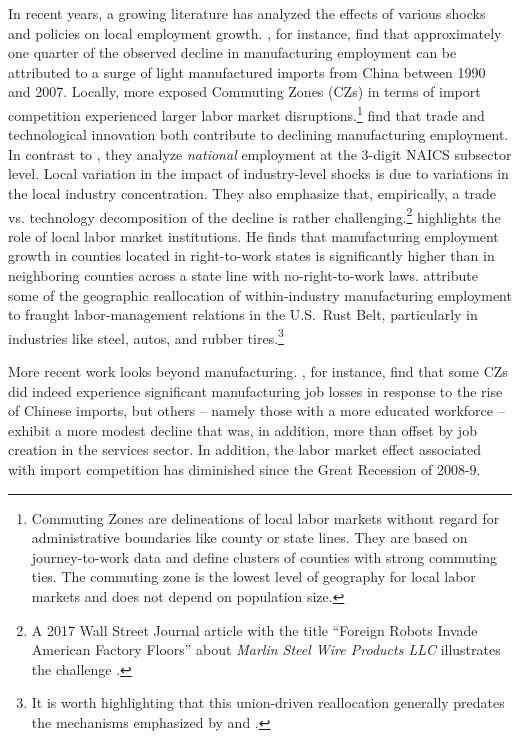 \documentclass[onehalfspacing,11pt]{article}
\begin{document}
In recent years, a growing literature has analyzed the effects of various shocks and policies on local employment growth. \cite{Autor:2013}, for instance, find that approximately one quarter of the observed decline in manufacturing employment can be attributed to a surge of light manufactured imports from China between 1990 and 2007. Locally, more exposed Commuting Zones (CZs) in terms of import competition experienced larger labor market disruptions.\footnote{Commuting Zones are delineations of local labor markets without regard for administrative boundaries like county or state lines. They are based on journey-to-work data and define clusters of counties with strong commuting ties. The commuting zone is the lowest level of geography for local labor markets and does not depend on population size.} \cite{Fort:2018} find that trade and technological innovation both contribute to declining manufacturing employment. In contrast to \cite{Autor:2013}, they analyze {\it national} employment at the 3-digit NAICS subsector level. Local variation in the impact of industry-level shocks is due to variations in the local industry concentration. They also emphasize that, empirically, a trade vs. technology decomposition of the decline is rather challenging.\footnote{A 2017 Wall Street Journal article with the title ``Foreign Robots Invade American Factory Floors'' about {\it Marlin Steel Wire Products LLC} illustrates the challenge \citep{Michaels:2017}.}\cite{Holmes:1998} highlights the role of local labor market institutions. He finds that manufacturing employment growth in counties located in right-to-work states is significantly higher than in neighboring counties across a state line with no-right-to-work laws. \cite{Alder:2019b} attribute some of the geographic reallocation of within-industry manufacturing employment to fraught labor-management relations in the U.S.~Rust Belt, particularly in industries like steel, autos, and rubber tires.\footnote{It is worth highlighting that this union-driven reallocation generally predates the mechanisms emphasized by \cite{Autor:2013} and \cite{Fort:2018}.}

More recent work looks beyond manufacturing. \cite{Bloom:2019}, for instance, find that some CZs did indeed experience significant manufacturing job losses in response to the rise of Chinese imports, but others -- namely those with a more educated workforce -- exhibit a more modest decline that was, in addition, more than offset by job creation in the services sector. In addition, the labor market effect associated with import competition has diminished since the Great Recession of 2008-9.
\end{document}
